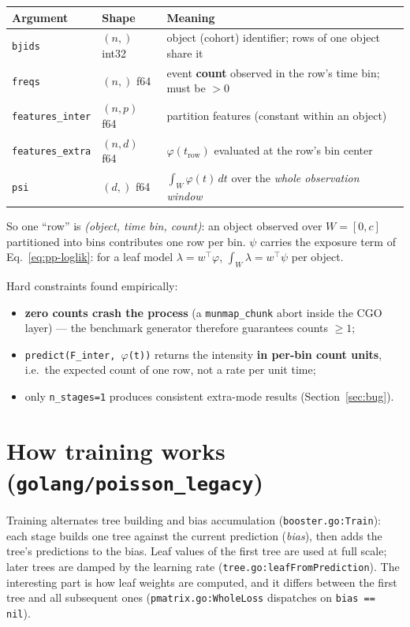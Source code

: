 \documentclass[11pt]{article}
\newcommand{\code}[1]{\texttt{\small #1}}
\begin{document}
\begin{center}\small
\begin{tabular}{lll}
\toprule
Argument & Shape & Meaning \\
\midrule
\code{bjids} & $(n,)$ int32 & object (cohort) identifier; rows of one object share it \\
\code{freqs} & $(n,)$ f64 & event \textbf{count} observed in the row's time bin; must be $> 0$ \\
\code{features\_inter} & $(n, p)$ f64 & partition features (constant within an object) \\
\code{features\_extra} & $(n, d)$ f64 & $\varphi(t_{\text{row}})$ evaluated at the row's bin center \\
\code{psi} & $(d,)$ f64 & $\int_{W} \varphi(t)\,dt$ over the \emph{whole observation window} \\
\bottomrule
\end{tabular}
\end{center}

So one ``row'' is \emph{(object, time bin, count)}: an object observed over $W=[0,c]$
partitioned into bins contributes one row per bin. $\psi$ carries the exposure term of
Eq.~\eqref{eq:pp-loglik}: for a leaf model $\lambda = w^\top\varphi$,
$\int_W \lambda = w^\top \psi$ per object.

Hard constraints found empirically:
\begin{itemize}
\item \textbf{zero counts crash the process} (a \code{munmap\_chunk} abort inside the
      CGO layer) --- the benchmark generator therefore guarantees counts $\ge 1$;
\item \code{predict(F\_inter, $\varphi$(t))} returns the intensity \textbf{in per-bin
      count units}, i.e.\ the expected count of one row, not a rate per unit time;
\item only \code{n\_stages=1} produces consistent extra-mode results (Section~\ref{sec:bug}).
\end{itemize}

\section{How training works (\code{golang/poisson\_legacy})}

Training alternates tree building and bias accumulation
(\code{booster.go:Train}): each stage builds one tree against the current prediction
(\emph{bias}), then adds the tree's predictions to the bias. Leaf values of the first
tree are used at full scale; later trees are damped by the learning rate
(\code{tree.go:leafFromPrediction}). The interesting part is how leaf weights are
computed, and it differs between the first tree and all subsequent ones
(\code{pmatrix.go:WholeLoss} dispatches on \code{bias == nil}).
\end{document}
